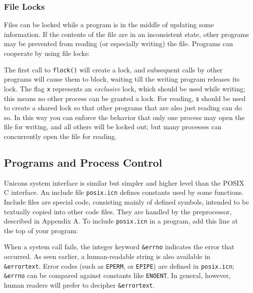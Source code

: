 \subsubsection{File Locks}

Files can be locked while a program is in the middle of
updating some information. If the contents of the file are in an
inconsistent state, other programs may be prevented from reading (or
especially writing) the file. Programs can cooperate by using file
locks:


The first call to \texttt{flock()} will create a lock, and subsequent
calls by other programs will cause them to block, waiting till the
writing program releases its lock. The flag
\texttt{{\textquotedbl}x{\textquotedbl}} represents an
\textit{exclusive} lock, which should be used while writing; this means
no other process can be granted a lock. For reading,
\texttt{{\textquotedbl}s{\textquotedbl}} should be used to create a
shared lock so that other programs that are also just reading can do
so. In this way you can enforce the behavior that only one process may
open the file for writing, and all others will be locked out; but many
processes can concurrently open the file for reading.

\subsection{Programs and Process Control}

Unicon{\textquotesingle}s system interface is similar but simpler and
higher level than the POSIX C interface. An include file
\texttt{posix.icn} defines constants used by some functions. Include
files are special code, consisting mainly of defined symbols, intended
to be textually copied into other code files. They are handled by the
preprocessor, described in Appendix A. To include \texttt{posix.icn} in
a program, add this line at the top of your program:


When a system call fails, the integer keyword
\texttt{\&errno} indicates the error that occurred. As seen earlier, a
human-readable string is also available in \texttt{\&errortext}. Error codes (such as \texttt{EPERM}, or
\texttt{EPIPE}) are defined in \texttt{posix.icn}; \texttt{\&errno} can be compared against constants like
\texttt{ENOENT}. In general, however, human readers will prefer to
decipher \texttt{\&errortext}.

